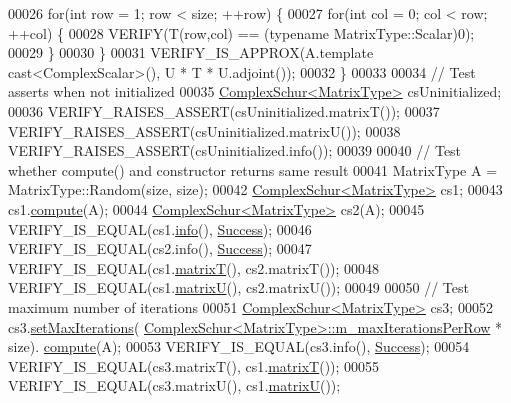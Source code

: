 \begin{DoxyCode}
00026     \textcolor{keywordflow}{for}(\textcolor{keywordtype}{int} row = 1; row < size; ++row) \{
00027       \textcolor{keywordflow}{for}(\textcolor{keywordtype}{int} col = 0; col < row; ++col) \{
00028         VERIFY(T(row,col) == (\textcolor{keyword}{typename} MatrixType::Scalar)0);
00029       \}
00030     \}
00031     VERIFY\_IS\_APPROX(A.template cast<ComplexScalar>(), U * T * U.adjoint());
00032   \}
00033 
00034   \textcolor{comment}{// Test asserts when not initialized}
00035   \hyperlink{group___eigenvalues___module}{ComplexSchur<MatrixType>} csUninitialized;
00036   VERIFY\_RAISES\_ASSERT(csUninitialized.matrixT());
00037   VERIFY\_RAISES\_ASSERT(csUninitialized.matrixU());
00038   VERIFY\_RAISES\_ASSERT(csUninitialized.info());
00039   
00040   \textcolor{comment}{// Test whether compute() and constructor returns same result}
00041   MatrixType A = MatrixType::Random(size, size);
00042   \hyperlink{group___eigenvalues___module}{ComplexSchur<MatrixType>} cs1;
00043   cs1.\hyperlink{group___eigenvalues___module_a3543d2c286563108cd9ace672bbb1c09}{compute}(A);
00044   \hyperlink{group___eigenvalues___module}{ComplexSchur<MatrixType>} cs2(A);
00045   VERIFY\_IS\_EQUAL(cs1.\hyperlink{group___eigenvalues___module_a8c5ee15fecfd126fc362c3f2fd28f51e}{info}(), \hyperlink{group__enums_gga85fad7b87587764e5cf6b513a9e0ee5ea52581b035f4b59c203b8ff999ef5fcea}{Success});
00046   VERIFY\_IS\_EQUAL(cs2.info(), \hyperlink{group__enums_gga85fad7b87587764e5cf6b513a9e0ee5ea52581b035f4b59c203b8ff999ef5fcea}{Success});
00047   VERIFY\_IS\_EQUAL(cs1.\hyperlink{group___eigenvalues___module_add3ab5ed83f7f2f06b79fa910a2d5684}{matrixT}(), cs2.matrixT());
00048   VERIFY\_IS\_EQUAL(cs1.\hyperlink{group___eigenvalues___module_afed8177cf9836f032d42bdb6c6bc6e01}{matrixU}(), cs2.matrixU());
00049 
00050   \textcolor{comment}{// Test maximum number of iterations}
00051   \hyperlink{group___eigenvalues___module}{ComplexSchur<MatrixType>} cs3;
00052   cs3.\hyperlink{group___eigenvalues___module_a6ca227fbd5387f3a625351354b8eec44}{setMaxIterations}(
      \hyperlink{group___eigenvalues___module_class_eigen_1_1_complex_schur}{ComplexSchur<MatrixType>::m\_maxIterationsPerRow} * size).
      \hyperlink{group___eigenvalues___module_a3543d2c286563108cd9ace672bbb1c09}{compute}(A);
00053   VERIFY\_IS\_EQUAL(cs3.info(), \hyperlink{group__enums_gga85fad7b87587764e5cf6b513a9e0ee5ea52581b035f4b59c203b8ff999ef5fcea}{Success});
00054   VERIFY\_IS\_EQUAL(cs3.matrixT(), cs1.\hyperlink{group___eigenvalues___module_add3ab5ed83f7f2f06b79fa910a2d5684}{matrixT}());
00055   VERIFY\_IS\_EQUAL(cs3.matrixU(), cs1.\hyperlink{group___eigenvalues___module_afed8177cf9836f032d42bdb6c6bc6e01}{matrixU}());

\end{DoxyCode}
